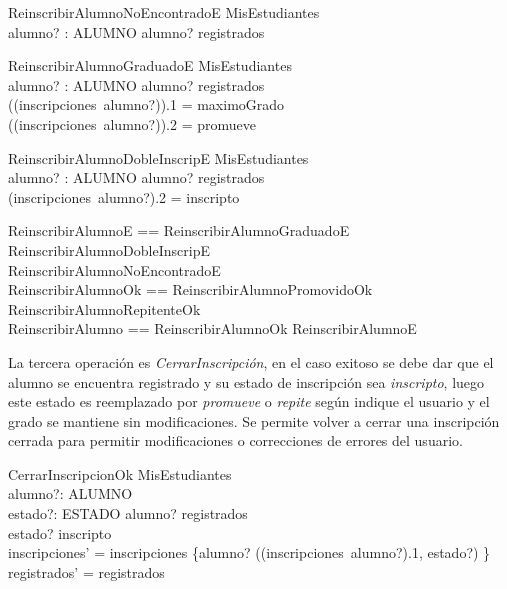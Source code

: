 \documentclass{article}
\begin{document}
\begin{schema}{ReinscribirAlumnoNoEncontradoE}
    \Xi MisEstudiantes \\
    alumno? : ALUMNO
    \where
    alumno? \notin registrados
\end{schema}

\begin{schema}{ReinscribirAlumnoGraduadoE}
    \Xi MisEstudiantes \\
    alumno? : ALUMNO
    \where
    alumno? \in registrados \\
    ((inscripciones~alumno?)).1 = maximoGrado \\
    ((inscripciones~alumno?)).2 = promueve 
\end{schema}

\begin{schema}{ReinscribirAlumnoDobleInscripE}
    \Xi MisEstudiantes \\
    alumno? : ALUMNO
    \where
    alumno? \in registrados \\
    (inscripciones~alumno?).2 = inscripto
\end{schema}

\begin{zed}
    ReinscribirAlumnoE == ReinscribirAlumnoGraduadoE \lor ReinscribirAlumnoDobleInscripE \\
        \lor ReinscribirAlumnoNoEncontradoE \\
    ReinscribirAlumnoOk == ReinscribirAlumnoPromovidoOk \lor ReinscribirAlumnoRepitenteOk \\
    ReinscribirAlumno == ReinscribirAlumnoOk \lor ReinscribirAlumnoE
\end{zed}

La tercera operación es \emph{CerrarInscripción}, en el caso exitoso se debe dar que el alumno se encuentra registrado y su estado de inscripción sea \emph{inscripto}, luego este estado es reemplazado por \emph{promueve} o \emph{repite} según indique el usuario y el grado se mantiene sin modificaciones. Se permite volver a cerrar una inscripción cerrada para permitir modificaciones o correcciones de errores del usuario.

\begin{schema}{CerrarInscripcionOk}
    \Delta MisEstudiantes \\
    alumno?: ALUMNO \\
    estado?: ESTADO
    \where
    alumno? \in registrados \\
    estado? \neq inscripto \\
    inscripciones' = inscripciones \oplus \{alumno? \mapsto ((inscripciones~alumno?).1, estado?) \} \\
    registrados' = registrados
\end{schema}
\end{document}

